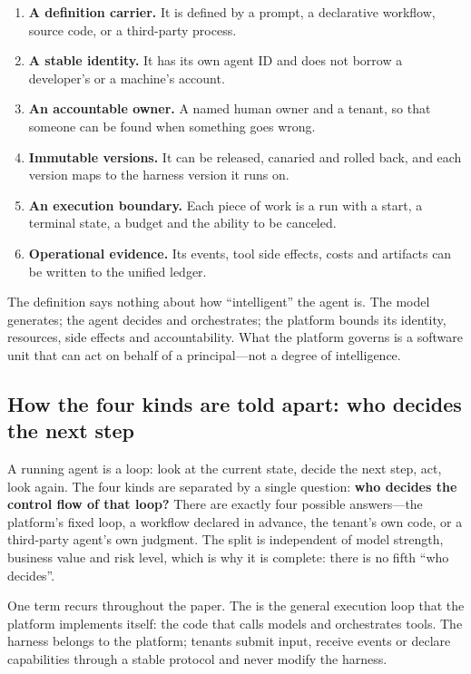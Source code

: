\begin{enumerate}
  \item \textbf{A definition carrier.} It is defined by a prompt, a declarative workflow, source code, or a third-party process.
  \item \textbf{A stable identity.} It has its own agent ID and does not borrow a developer's or a machine's account.
  \item \textbf{An accountable owner.} A named human owner and a tenant, so that someone can be found when something goes wrong.
  \item \textbf{Immutable versions.} It can be released, canaried and rolled back, and each version maps to the harness version it runs on.
  \item \textbf{An execution boundary.} Each piece of work is a run with a start, a terminal state, a budget and the ability to be canceled.
  \item \textbf{Operational evidence.} Its events, tool side effects, costs and artifacts can be written to the unified ledger.
\end{enumerate}

The definition says nothing about how ``intelligent'' the agent is. The model generates; the agent decides and orchestrates; the platform bounds its identity, resources, side effects and accountability. What the platform governs is a software unit that can act on behalf of a principal---not a degree of intelligence.

\subsection{How the four kinds are told apart: who decides the next step}

A running agent is a loop: look at the current state, decide the next step, act, look again. The four kinds are separated by a single question: \textbf{who decides the control flow of that loop?} There are exactly four possible answers---the platform's fixed loop, a workflow declared in advance, the tenant's own code, or a third-party agent's own judgment. The split is independent of model strength, business value and risk level, which is why it is complete: there is no fifth ``who decides''.

One term recurs throughout the paper. The  is the general execution loop that the platform implements itself: the code that calls models and orchestrates tools. The harness belongs to the platform; tenants submit input, receive events or declare capabilities through a stable protocol and never modify the harness.

